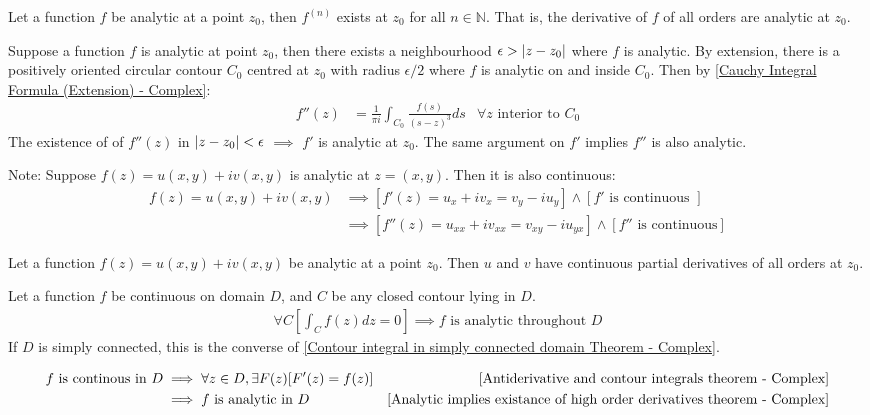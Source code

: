 \documentclass[12pt, english]{book}
\makeatletter
\renewenvironment{proof}[1][\proofname]{\par
	\pushQED{\qed}%
	\normalfont \topsep6\p@\@plus6\p@\relax
	\list{}{%
		\settowidth{\leftmargin}{\itshape\proofname:\hskip\labelsep}%
		\setlength{\labelwidth}{0pt}%
		\setlength{\itemindent}{-\leftmargin}%
	}%
	\item[\hskip\labelsep\itshape#1\@addpunct{:}]\ignorespaces
}{%
	\popQED\endlist\@endpefalse
}
\makeatother
\begin{document}
	\begin{theorem}
		\label{Analytic implies existance of high order derivatives theorem - Complex}
		Let a function \(f\) be analytic at a point \(z_0\), then \(f^{(n)}\) exists at \(z_0\) for all \(n \in \mathbb{N}\). That is, the derivative of \(f\) of all orders are analytic at \(z_0\).
	\end{theorem}
	\begin{proof}
		Suppose a function \(f\) is analytic at point \(z_0\), then there exists a neighbourhood \(\epsilon > \abs{z - z_0}\) where \(f\) is analytic. By extension, there is a positively oriented circular contour \(C_0\) centred at \(z_0\) with radius \(\epsilon / 2\) where \(f\) is analytic on and inside \(C_0\).
		Then by \cref{Cauchy Integral Formula (Extension) - Complex}:
		\begin{align*}
			f''(z) &= \frac{1}{\pi i} \int_{C_0} \frac{f(s)}{(s-z)^3} ds & \forall z \text{ interior to } C_0
		\end{align*}
		The existence of of \(f''(z)\) in \(\abs{z-z_0}<\epsilon\) \(\implies\) \(f'\) is analytic at \(z_0\). The same argument on \(f'\) implies \(f''\) is also analytic.
	\end{proof}
	
	Note: Suppose \(f(z) = u(x,y) + iv(x,y)\) is analytic at \(z = (x,y)\). Then it is also continuous: 
	\begin{align*}
		f(z) = u(x,y) + iv(x,y) 
		&\implies [f'(z) = u_x + iv_x = v_y - iu_y] \land [f' \text{ is continuous }] \\
		&\implies [f''(z) = u_{xx} + iv_{xx} = v_{xy} - iu_{yx}] \land [f'' \text{ is continuous}]
 	\end{align*}
	
	\begin{corollary}
		Let a function \(f(z) = u(x,y) + iv(x,y)\) be analytic at a point \(z_0\). Then \(u\) and \(v\) have continuous partial derivatives of all orders at \(z_0\). 
	\end{corollary}

	\begin{theorem}
		\label{Continuity on closed contour implies and zero contour integral implies analycity Theorem - Complex}
		Let a function \(f\) be continuous on domain \(D\), and \(C\) be any closed contour lying in \(D\).
		\begin{align*}
			\forall C \left[\int_{C} f(z) dz = 0 \right]
			\implies f \text{ is analytic throughout } D
		\end{align*}
		If \(D\) is simply connected, this is the converse of \cref{Contour integral in simply connected domain Theorem - Complex}.
	\end{theorem}
	\begin{proof}
		\begin{align*}
			f \text{ is continous in } D
			&\implies \forall z \in D, \exists F(z) [F'(z) = f(z)] 
				& \Cref{Antiderivative and contour integrals theorem - Complex}\\
			&\implies f \text{ is analytic in }  D
				& \Cref{Analytic implies existance of high order derivatives theorem - Complex}
		\end{align*}
	\end{proof}
\end{document}
